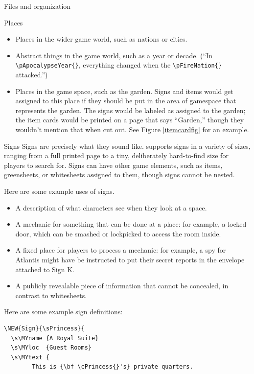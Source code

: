 \documentclass[sheet]{GameTexBase}
\begin{document}
\begin{section}{Files and organization}
\begin{subsection}{Places}
\begin{itemize}
\item Places in the wider game world, such as nations or cities.
\item Abstract things in the game world, such as a year or decade.  (``In \lstinline|\pApocalypseYear{}|, everything changed when the \lstinline|\pFireNation{}| attacked.'')
\item Places in the game space, such as the garden.  Signs and items would get assigned to this place if they should be put in the area of gamespace that represents the garden.  The signs would be labeled as assigned to the garden; 
the item cards would be printed on a page that says ``Garden,'' though they wouldn't mention that when cut out.  See Figure \ref{itemcardfig} for an example.
\end{itemize}
\end{subsection}
\begin{subsection}{Signs}
Signs are precisely what they sound like.  \gametex{} supports signs in a variety of sizes, ranging from a full printed page to a tiny, deliberately hard-to-find size for players to search for.
Signs can have other game elements, such as items, greensheets, or whitesheets assigned to them, though signs cannot be nested.

Here are some example uses of signs.
\begin{itemize}
\item A description of what characters see when they look at a space.
\item A mechanic for something that can be done at a place: for example, a locked door, which can be smashed or lockpicked to access the room inside.
\item A fixed place for players to process a mechanic: for example, a spy for Atlantis might have be instructed to put their secret reports in the envelope attached to Sign K.
\item A publicly revealable piece of information that cannot be concealed, in contrast to whitesheets.
\end{itemize}

Here are some example sign definitions:
\begin{verbatim}
\NEW{Sign}{\sPrincess}{
  \s\MYname	{A Royal Suite}
  \s\MYloc	{Guest Rooms}
  \s\MYtext	{
		This is {\bf \cPrincess{}'s} private quarters.
		

\end{verbatim}
\end{subsection}
\end{section}
\end{document}
